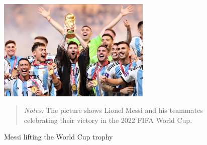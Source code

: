 \begin{figure}[ht!]
    \centering
    \includegraphics[width=0.65\textwidth]{chapter_two/graphics/messi_world_cup.jpg}
    \caption{Messi lifting the World Cup trophy}
    \label{fig:messi_world_cup}
    \begin{quote}
        \textit{Notes:} 
        The picture shows Lionel Messi and his teammates celebrating their victory 
        in the 2022 FIFA World Cup.
    \end{quote} 
\end{figure}
